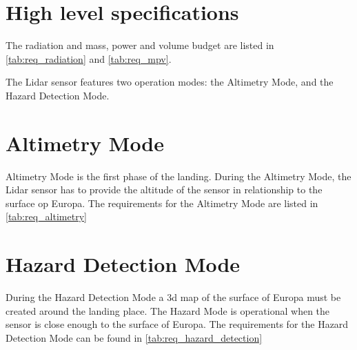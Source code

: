 \section{High level specifications} 
\label{ssec:high_level_specifications}
The radiation and mass, power and volume budget are listed in \cref{tab:req_radiation} and \cref{tab:req_mpv}.




The Lidar sensor features two operation modes: the Altimetry Mode, and the Hazard Detection Mode. 

\section{Altimetry Mode} 
\label{ssec:altimetry_mode}

Altimetry Mode is the first phase of the landing. During the Altimetry Mode, the Lidar sensor has to provide the altitude of the sensor in relationship to the surface op Europa. The requirements for the Altimetry Mode are listed in \cref{tab:req_altimetry}



\section{Hazard Detection Mode} 
\label{ssec:hazard_detection_mode}

During the Hazard Detection Mode a 3d map of the surface of Europa must be created around the landing place. The Hazard Mode is operational when the sensor is close enough to the surface of Europa. The requirements for the Hazard Detection Mode can be found in \cref{tab:req_hazard_detection}


